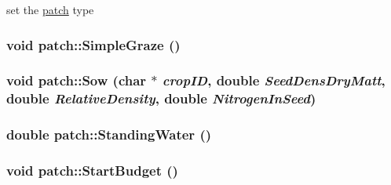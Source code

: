 set the \hyperlink{classpatch}{patch} type \hypertarget{classpatch_a6b0055a5b5aa214e2f9e8f5024c942aa}{
\subsubsection[{SimpleGraze}]{\setlength{\rightskip}{0pt plus 5cm}void patch::SimpleGraze ()}}
\label{classpatch_a6b0055a5b5aa214e2f9e8f5024c942aa}
\hypertarget{classpatch_a3ecb47e31952d5a27c52b515c46f0928}{
\subsubsection[{Sow}]{\setlength{\rightskip}{0pt plus 5cm}void patch::Sow (char $\ast$ {\em cropID}, \/  double {\em SeedDensDryMatt}, \/  double {\em RelativeDensity}, \/  double {\em NitrogenInSeed})}}
\label{classpatch_a3ecb47e31952d5a27c52b515c46f0928}
\hypertarget{classpatch_a9ba4cf30533b050cb7e87b58defd4268}{
\subsubsection[{StandingWater}]{\setlength{\rightskip}{0pt plus 5cm}double patch::StandingWater ()}}
\label{classpatch_a9ba4cf30533b050cb7e87b58defd4268}
\hypertarget{classpatch_a16276b251ebd3f27715ea21be08dfa68}{
\subsubsection[{StartBudget}]{\setlength{\rightskip}{0pt plus 5cm}void patch::StartBudget ()}}
\label{classpatch_a16276b251ebd3f27715ea21be08dfa68}


